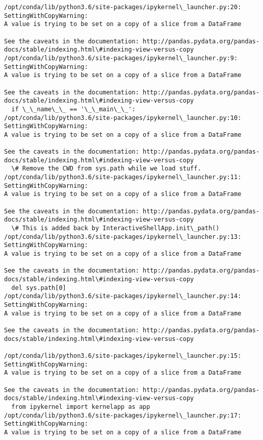 \documentclass[11pt]{article}
\begin{document}
    \begin{Verbatim}[commandchars=\\\{\}]
/opt/conda/lib/python3.6/site-packages/ipykernel\_launcher.py:20: SettingWithCopyWarning: 
A value is trying to be set on a copy of a slice from a DataFrame

See the caveats in the documentation: http://pandas.pydata.org/pandas-docs/stable/indexing.html\#indexing-view-versus-copy
/opt/conda/lib/python3.6/site-packages/ipykernel\_launcher.py:9: SettingWithCopyWarning: 
A value is trying to be set on a copy of a slice from a DataFrame

See the caveats in the documentation: http://pandas.pydata.org/pandas-docs/stable/indexing.html\#indexing-view-versus-copy
  if \_\_name\_\_ == '\_\_main\_\_':
/opt/conda/lib/python3.6/site-packages/ipykernel\_launcher.py:10: SettingWithCopyWarning: 
A value is trying to be set on a copy of a slice from a DataFrame

See the caveats in the documentation: http://pandas.pydata.org/pandas-docs/stable/indexing.html\#indexing-view-versus-copy
  \# Remove the CWD from sys.path while we load stuff.
/opt/conda/lib/python3.6/site-packages/ipykernel\_launcher.py:11: SettingWithCopyWarning: 
A value is trying to be set on a copy of a slice from a DataFrame

See the caveats in the documentation: http://pandas.pydata.org/pandas-docs/stable/indexing.html\#indexing-view-versus-copy
  \# This is added back by InteractiveShellApp.init\_path()
/opt/conda/lib/python3.6/site-packages/ipykernel\_launcher.py:13: SettingWithCopyWarning: 
A value is trying to be set on a copy of a slice from a DataFrame

See the caveats in the documentation: http://pandas.pydata.org/pandas-docs/stable/indexing.html\#indexing-view-versus-copy
  del sys.path[0]
/opt/conda/lib/python3.6/site-packages/ipykernel\_launcher.py:14: SettingWithCopyWarning: 
A value is trying to be set on a copy of a slice from a DataFrame

See the caveats in the documentation: http://pandas.pydata.org/pandas-docs/stable/indexing.html\#indexing-view-versus-copy
  
/opt/conda/lib/python3.6/site-packages/ipykernel\_launcher.py:15: SettingWithCopyWarning: 
A value is trying to be set on a copy of a slice from a DataFrame

See the caveats in the documentation: http://pandas.pydata.org/pandas-docs/stable/indexing.html\#indexing-view-versus-copy
  from ipykernel import kernelapp as app
/opt/conda/lib/python3.6/site-packages/ipykernel\_launcher.py:17: SettingWithCopyWarning: 
A value is trying to be set on a copy of a slice from a DataFrame


\end{Verbatim}
\end{document}
